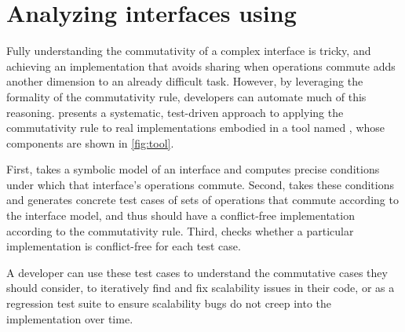 \section{Analyzing interfaces using \tool}
\label{sec:tool}


Fully understanding the commutativity of a complex interface is
tricky, and achieving an
implementation that avoids sharing when operations commute adds another
dimension to an already difficult task.  However, by leveraging the
formality of the commutativity rule, developers can automate much of this
reasoning.   presents a systematic, test-driven approach to
applying the commutativity rule to real implementations embodied in a
tool named \tool, whose components are shown in
\cref{fig:tool}.


\begin{figure*}

\caption{The components of \tool. \XXX![AC]{Fix overfull hbox.}}
\label{fig:tool}
\end{figure*}

First, \analyzer takes a symbolic model of
an interface and computes precise conditions under which that interface's
operations commute.  Second, \testgen takes
these conditions and generates concrete test cases of sets of operations
that commute according to the interface model, and thus should
have a conflict-free implementation according to the commutativity rule.
%
Third, \mtrace checks whether a particular implementation is
conflict-free for each test case.

A developer can use these test cases to understand the
commutative cases they should consider,
to iteratively find and fix scalability
issues in their
code, or as a regression test suite to ensure
scalability bugs do not creep into the implementation over time.


\subsection{\analyzer}
\label{sec:tool:analyzer}



